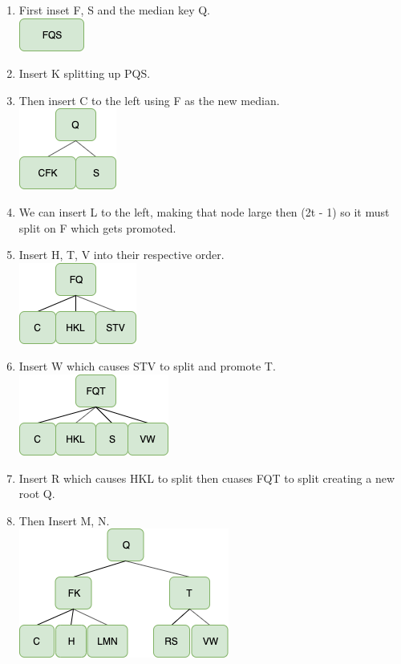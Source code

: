 \documentclass{article}
\begin{document}
\begin{enumerate}
    \begin{enumerate}
      \item First inset F, S and the median key Q.\\
      \includegraphics[scale=0.5]{10a.png}
      \item Insert K splitting up PQS.
      \item Then insert C to the left using F as the new median.\\
      \includegraphics[scale=0.5]{10b.png}
      \item We can insert L to the left, making that node large then (2t - 1) so it must split on F which gets promoted.
      \item Insert H, T, V into their respective order.\\
      \includegraphics[scale=0.5]{10c.png}
      \item Insert W which causes STV to split and promote T.\\
      \includegraphics[scale=0.5]{10d.png}
      \item Insert R which causes HKL to split then cuases FQT to split creating a new root Q.
      \item Then Insert M, N.\\
      \includegraphics[scale=0.5]{10e.png}

\end{enumerate}
\end{enumerate}
\end{document}
